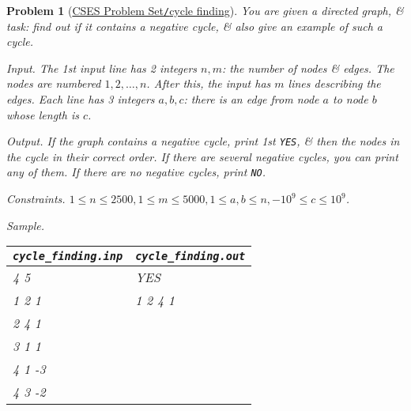 \documentclass{article}
\newtheorem{problem}{Problem}
\begin{document}
\begin{problem}[\href{https://cses.fi/problemset/task/1197}{CSES Problem Set{\tt/}cycle finding}]
	You are given a directed graph, \& task: find out if it contains a negative cycle, \& also give an example of such a cycle.
	\item {\sf Input.} The 1st input line has 2 integers $n,m$: the number of nodes \& edges. The nodes are numbered $1,2,\ldots,n$. After this, the input has $m$ lines describing the edges. Each line has 3 integers $a,b,c$: there is an edge from node $a$ to node $b$ whose length is $c$.
	\item {\sf Output.} If the graph contains a negative cycle, print 1st {\tt YES}, \& then the nodes in the cycle in their correct order. If there are several negative cycles, you can print any of them. If there are no negative cycles, print {\tt NO}.
	\item {\sf Constraints.} $1\le n\le2500,1\le m\le5000,1\le a,b\le n,-10^9\le c\le10^9$.
	\item {\sf Sample.}
	\begin{table}[H]
		\centering
		\begin{tabular}{|l|l|}
			\hline
			\verb|cycle_finding.inp| & \verb|cycle_finding.out| \\
			\hline
			4 5 & YES \\
			1 2 1 & 1 2 4 1 \\
			2 4 1 & \\
			3 1 1 & \\
			4 1 -3 & \\
			4 3 -2 & \\
			\hline
		\end{tabular}
	\end{table}
\end{problem}
\end{document}
